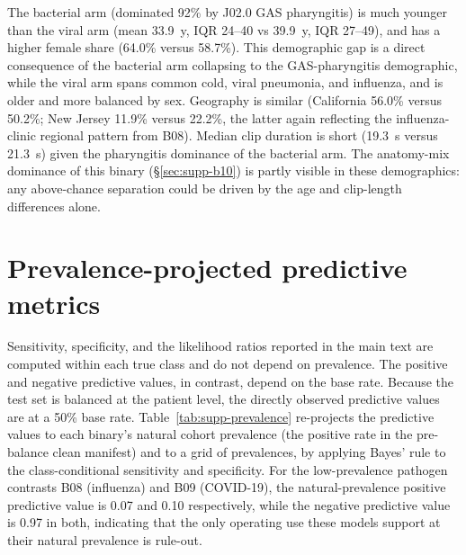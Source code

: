 \documentclass[utf8]{frontiers_suppmat} %
\begin{document}
The bacterial arm (dominated 92\% by J02.0 GAS pharyngitis) is much
younger than the viral arm (mean 33.9~y, IQR 24--40 vs 39.9~y, IQR
27--49), and has a higher female share (64.0\% versus 58.7\%). This
demographic gap is a direct consequence of the bacterial arm
collapsing to the GAS-pharyngitis demographic, while the viral arm
spans common cold, viral pneumonia, and influenza, and is older and more
balanced by sex. Geography is similar (California 56.0\% versus
50.2\%; New Jersey 11.9\% versus 22.2\%, the latter again reflecting
the influenza-clinic regional pattern from B08). Median clip duration
is short (19.3~s versus 21.3~s) given the pharyngitis dominance of
the bacterial arm. The anatomy-mix dominance of this binary
(\S\ref{sec:supp-b10}) is partly visible in these demographics: any
above-chance separation could be driven by the age and clip-length
differences alone.

\section{Prevalence-projected predictive metrics}
\label{sec:supp-prevalence}

Sensitivity, specificity, and the likelihood ratios reported in the
main text are computed within each true class and do not depend on
prevalence. The positive and negative predictive values, in contrast,
depend on the base rate. Because the test set is balanced at the
patient level, the directly observed predictive values are at a 50\%
base rate. Table~\ref{tab:supp-prevalence} re-projects the
predictive values to each binary's natural cohort prevalence (the
positive rate in the pre-balance clean manifest) and to a grid of
prevalences, by applying Bayes' rule to the class-conditional
sensitivity and specificity. For the low-prevalence pathogen contrasts
B08 (influenza) and B09 (COVID-19), the natural-prevalence positive
predictive value is 0.07 and 0.10 respectively, while the negative
predictive value is 0.97 in both, indicating that the only operating
use these models support at their natural prevalence is rule-out.
\end{document}
